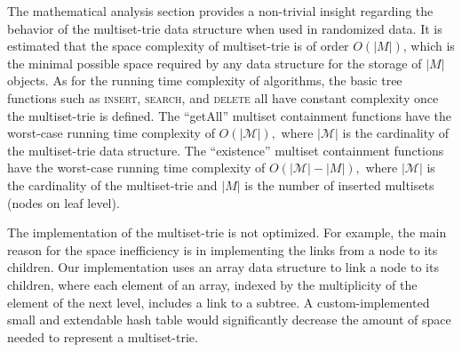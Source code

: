 \documentclass[algorithms,article,accept,pdftex,moreauthors]{Definitions/mdpi}
\begin{document}
%
The mathematical analysis section provides a non-trivial insight regarding the behavior of the multiset-trie data structure when used in randomized data. It is estimated that the space complexity of multiset-trie is of order $O(|M|)$, which is the minimal possible space required by any data structure for the storage of $|M|$ objects. 
As for the running time complexity of algorithms, the basic tree functions such as \textsc{insert}, \textsc{search}, and \textsc{delete} all have constant complexity once the multiset-trie is defined. The ``getAll'' multiset containment functions have the worst-case running time complexity of $O(|\mathcal{M}|),$ where $|\mathcal{M}|$ is the cardinality of the multiset-trie data structure. The ``existence'' multiset containment functions have the worst-case running time complexity of $O(|\mathcal{M}| - |M|),$ where $|\mathcal{M}|$ is the cardinality of the multiset-trie and $|M|$ is the number of inserted multisets (nodes on leaf level). 


The implementation of the multiset-trie is not optimized. For example, the main reason for the space inefficiency is in implementing the links from a node to its children. Our implementation uses an array data structure to link a node to its children, where each element of an array, indexed by the multiplicity of the element of the next level, includes a link to a subtree. A custom-implemented small and extendable hash table would significantly decrease the amount of space needed to represent a multiset-trie.
\end{document}
